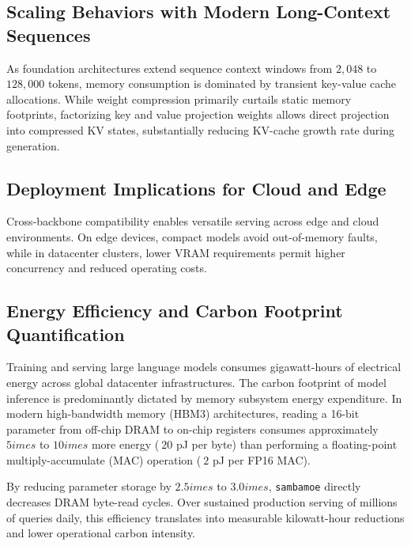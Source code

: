 \subsection{Scaling Behaviors with Modern Long-Context Sequences}
As foundation architectures extend sequence context windows from $2{,}048$ to $128{,}000$ tokens, memory consumption is dominated by transient key-value cache allocations. While weight compression primarily curtails static memory footprints, factorizing key and value projection weights allows direct projection into compressed KV states, substantially reducing KV-cache growth rate during generation.

\subsection{Deployment Implications for Cloud and Edge}
Cross-backbone compatibility enables versatile serving across edge and cloud environments. On edge devices, compact models avoid out-of-memory faults, while in datacenter clusters, lower VRAM requirements permit higher concurrency and reduced operating costs.

\subsection{Energy Efficiency and Carbon Footprint Quantification}
Training and serving large language models consumes gigawatt-hours of electrical energy across global datacenter infrastructures. The carbon footprint of model inference is predominantly dictated by memory subsystem energy expenditure. In modern high-bandwidth memory (HBM3) architectures, reading a 16-bit parameter from off-chip DRAM to on-chip registers consumes approximately $5	imes$ to $10	imes$ more energy ($~20$ pJ per byte) than performing a floating-point multiply-accumulate (MAC) operation ($~2$ pJ per FP16 MAC).

By reducing parameter storage by $2.5	imes$ to $3.0	imes$, \texttt{sambamoe} directly decreases DRAM byte-read cycles. Over sustained production serving of millions of queries daily, this efficiency translates into measurable kilowatt-hour reductions and lower operational carbon intensity.
